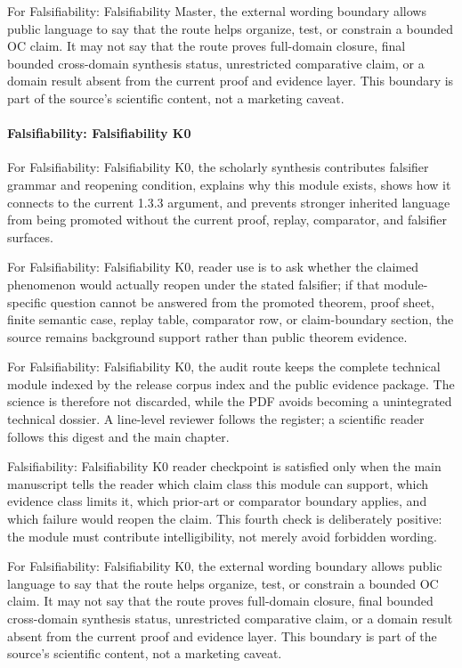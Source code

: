 For Falsifiability: Falsifiability Master, the external wording boundary allows public language to say that the route helps organize, test, or constrain a bounded OC claim. It may not say that the route proves full-domain closure, final bounded cross-domain synthesis status, unrestricted comparative claim, or a domain result absent from the current proof and evidence layer. This boundary is part of the source's scientific content, not a marketing caveat.


\paragraph{Falsifiability: Falsifiability K0}

For Falsifiability: Falsifiability K0, the scholarly synthesis contributes falsifier grammar and reopening condition, explains why this module exists, shows how it connects to the current 1.3.3 argument, and prevents stronger inherited language from being promoted without the current proof, replay, comparator, and falsifier surfaces.


For Falsifiability: Falsifiability K0, reader use is to ask whether the claimed phenomenon would actually reopen under the stated falsifier; if that module-specific question cannot be answered from the promoted theorem, proof sheet, finite semantic case, replay table, comparator row, or claim-boundary section, the source remains background support rather than public theorem evidence.


For Falsifiability: Falsifiability K0, the audit route keeps the complete technical module indexed by the release corpus index and the public evidence package. The science is therefore not discarded, while the PDF avoids becoming a unintegrated technical dossier. A line-level reviewer follows the register; a scientific reader follows this digest and the main chapter.


Falsifiability: Falsifiability K0 reader checkpoint is satisfied only when the main manuscript tells the reader which claim class this module can support, which evidence class limits it, which prior-art or comparator boundary applies, and which failure would reopen the claim. This fourth check is deliberately positive: the module must contribute intelligibility, not merely avoid forbidden wording.


For Falsifiability: Falsifiability K0, the external wording boundary allows public language to say that the route helps organize, test, or constrain a bounded OC claim. It may not say that the route proves full-domain closure, final bounded cross-domain synthesis status, unrestricted comparative claim, or a domain result absent from the current proof and evidence layer. This boundary is part of the source's scientific content, not a marketing caveat.


